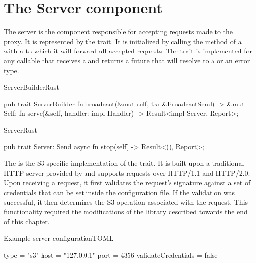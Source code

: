 \section{The Server component}

The server is the component responsible for accepting requests made to the proxy. It is represented by the  trait. 
It is initialized by calling the  method of a  with a  to which it will forward all accepted requests. The  trait is implemented for any callable that receives a  and returns a future that will resolve to a  or an error type.

\begin{multicols}{2}
	\begin{codeblock}{ServerBuilder}{Rust}
		\begin{rustcode}
			pub trait ServerBuilder {
				fn broadcast(&mut self, tx: &BroadcastSend) -> &mut Self;
				fn serve(&self, handler: impl Handler) -> Result<impl Server, Report>;
			}
		\end{rustcode}
	\end{codeblock}

	\begin{codeblock}{Server}{Rust}
		\begin{rustcode}
			pub trait Server: Send {
				async fn stop(self) -> Result<(), Report>;
			}
		\end{rustcode}
	\end{codeblock}
\end{multicols}

The  is the S3-specific implementation of the  trait. It is built upon a traditional HTTP server provided by  and supports requests over HTTP/1.1 and HTTP/2.0. Upon receiving a request, it first validates the request's signature against a set of credentials that can be set inside the configuration file. If the validation was successful, it then determines the S3 operation associated with the request. This functionality required the modifications of the  library described towards the end of this chapter.

\begin{codeblock}{Example server configuration}{TOML}
	\begin{javacode}
		[server]
		type = "s3"
		host = "127.0.0.1"
		port = 4356
		validateCredentials = false
	\end{javacode}
\end{codeblock}

